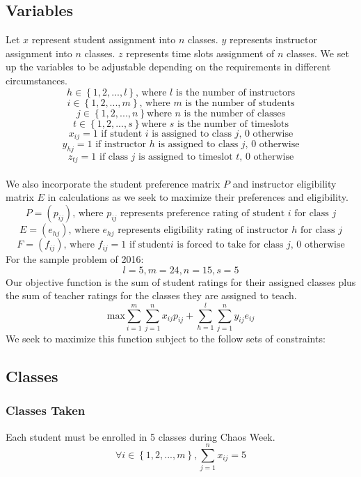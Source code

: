 \documentclass[11pt]{article}
\begin{document}
\subsection{Variables}
\indent Let $x$ represent student assignment into $n$ classes. $y$ represents instructor assignment into $n$ classes. $z$ represents time slots assignment of $n$ classes. We set up the variables to be adjustable depending on the requirements in different circumstances. 
\[h \in \left\{ {1,2,...,l}\right\}\text{, where 
}l \text{ is the number of instructors}\]
\[i \in \left\{ {1,2,...,m}\right\}\text{, where 
}m \text{ is the number of students}\]
\[j \in \left\{{1,2,...,n}\right\} \text{where } n \text{ is the number of classes} \]
\[t \in \left\{{1,2,...,s}\right\} \text{where } s \text{ is the number of timeslots} \]
\[x_{ij} = 1 \text{ if student } i \text{ is assigned to class }j \text{, 0 otherwise}\]
\[y_{hj} = 1 \text{ if instructor } h  \text{ is assigned to class }j \text{, 0 otherwise}\]
\[z_{tj} = 1 \text{ if class } j  \text{ is assigned to timeslot }t \text{, 0 otherwise}\]\\
We also incorporate the student preference matrix $P$ and instructor eligibility matrix $E$ in calculations as we seek to maximize their preferences and eligibility.
\[P =(p_{ij}) \text{, where } p_{ij} \text{ represents preference rating of student } i \text{ for class }j\]
\[E =(e_{hj}) \text{, where } e_{hj} \text{ represents eligibility rating of instructor } h \text{ for class }j\]
\[F =(f_{ij}) \text{, where } f_{ij} = 1 \text{ if student} i \text{ is forced to take for class }j \text{, 0 otherwise}\]
For the sample problem of 2016:
\[l = 5, m = 24, n = 15, s = 5\]
\indent Our objective function is the sum of student ratings for their assigned classes plus the sum of teacher ratings for the classes they are assigned to teach.\\
\[\text{max} \sum_{i=1}^{m} \sum_{j=1}^{n}x_{ij}p_{ij} + \sum_{h=1}^{l}\sum_{j=1}^{n}y_{ij}e_{ij}\]
We seek to maximize this function subject to the follow sets of constraints:\\
\subsection{Classes}
\subsubsection{Classes Taken}
Each student must be enrolled in 5 classes during Chaos Week.
\[\forall i \in \left\{ {1,2,...,m}\right\},\sum_{j=1}^{n}x_{ij} = 5\]
\end{document}
